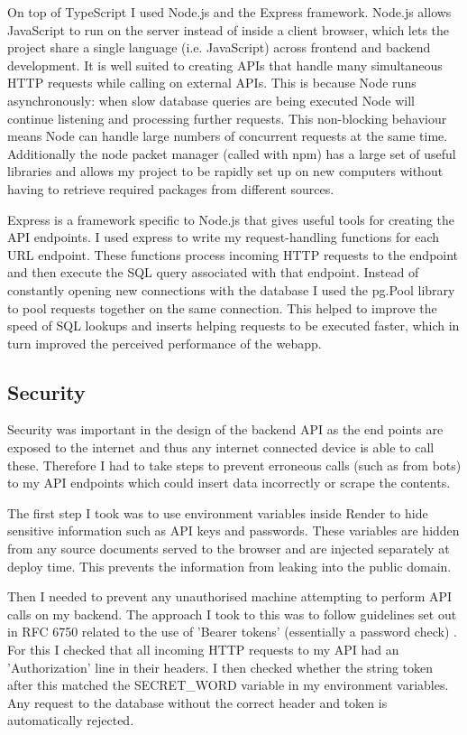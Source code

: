 On top of TypeScript I used Node.js and the Express framework. Node.js allows
JavaScript to run on the server instead of inside a client browser, which lets
the project share a single language (i.e. JavaScript) across frontend and
backend development. It is well suited to creating APIs that handle many
simultaneous HTTP requests while calling on external APIs. This is because Node
runs asynchronously: when slow database queries are being executed Node will
continue listening and processing further requests. This non-blocking behaviour
means Node can handle large numbers of concurrent requests at the same time.
Additionally the node packet manager (called with npm) has a large set of useful
libraries and allows my project to be rapidly set up on new computers without
having to retrieve required packages from different sources.

Express is a framework specific to Node.js that gives useful tools for creating
the API endpoints. I used express to write my request-handling functions for
each URL endpoint. These functions process incoming HTTP requests to the
endpoint and then execute the SQL query associated with that endpoint. Instead
of constantly opening new connections with the database I used the pg.Pool
library to pool requests together on the same connection. This helped to improve
the speed of SQL lookups and inserts helping requests to be executed faster,
which in turn improved the perceived performance of the webapp.

\subsection{Security}

Security was important in the design of the backend API as the end points are
exposed to the internet and thus any internet connected device is able to call
these. Therefore I had to take steps to prevent erroneous calls (such as from
bots) to my API endpoints which could insert data incorrectly or scrape the
contents.

The first step I took was to use environment variables inside Render to hide
sensitive information such as API keys and passwords. These variables are hidden
from any source documents served to the browser and are injected separately at
deploy time. This prevents the information from leaking into the public domain.

Then I needed to prevent any unauthorised machine attempting to perform API
calls on my backend. The approach I took to this was to follow guidelines set
out in RFC 6750 related to the use of 'Bearer tokens' (essentially a password
check) \cite{rfc6750}. For this I checked that all incoming HTTP requests to my
API had an 'Authorization' line in their headers. I then checked whether the
string token after this matched the SECRET\_WORD variable in my environment
variables. Any request to the database without the correct header and token is
automatically rejected.

